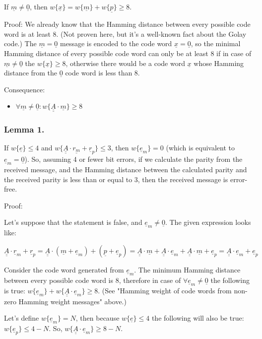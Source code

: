 \documentclass[11pt,a4paper,oneside]{report}             %
\def\doubleunderline#1{\underline{\underline{#1}}}
\def\dul#1{\doubleunderline{#1}}
\def\ul#1{\underline{#1}}
\begin{document}
If $\ul{m} \neq \ul{0}$, then $w\{ \ul{x} \} = w\{ \ul{m} \} + w\{ \ul{p} \} \geq 8$.

Proof:
We already know that the Hamming distance between every possible code word is at least 8.
(Not proven here, but it's a well-known fact about the Golay code.)
The $\ul{m} = \ul{0}$ message is encoded to the code word $\ul{x} = \ul{0}$, so
the minimal Hamming distance of every possible code word can only be at least 8 if
in case of $\ul{m} \neq \ul{0}$ the $w\{ \ul{x} \} \geq 8$, otherwise there
would be a code word $\ul{x}$ whose Hamming distance from the $\ul{0}$ code word is less than 8.

Consequence:
\begin{itemize}
    \item $\forall \ul{m} \neq \ul{0} : w\{ \dul{A} \cdot \ul{m} \} \geq 8$
\end{itemize}

\subsubsection{Lemma 1.}

If $w\{\ul{e}\} \leq 4$ and $w\{\dul{A} \cdot \ul {r_m} + \ul{r}_p\} \leq 3$,
then $w\{\ul{e}_m\} = 0$ (which is equivalent to $\ul{e}_m = \ul{0}$).
So, assuming 4 or fewer bit errors, if we calculate the parity from the received message, and
the Hamming distance between the calculated parity and the received parity is less than
or equal to 3, then the received message is error-free.

Proof:

Let's suppose that the statement is false, and $\ul{e}_m \neq \ul{0}$.
The given expression looks like:

\[
    \dul{A} \cdot \ul{r}_m + \ul{r}_p =
    \dul{A} \cdot ( \ul{m} + \ul{e}_m ) + ( \ul{p} + \ul{e}_p ) =
    \dul{A} \cdot \ul{m} + \dul{A} \cdot \ul{e}_m + \dul{A} \cdot \ul{m} + \ul{e}_p =
    \dul{A} \cdot \ul{e}_m + \ul{e}_p
\]

Consider the code word generated from $\ul{e}_m$. The minimum Hamming distance between every possible code word is 8, therefore
in case of $\forall \ul{e}_m \neq \ul{0}$ the following is true:
$w\{ \ul{e}_m \} +  w\{ \dul{A} \cdot \ul{e}_m \} \geq 8$.
(See "Hamming weight of code words from non-zero Hamming weight messages" above.)

Let's define $w\{ \ul{e}_m \} = N$, then because $w\{ \ul{e} \} \leq 4$ the following
will also be true: $w\{ \ul{e}_p \} \leq 4 - N$.
So, $w\{ \dul{A} \cdot \ul{e}_m \} \geq 8 - N$.
\end{document}
